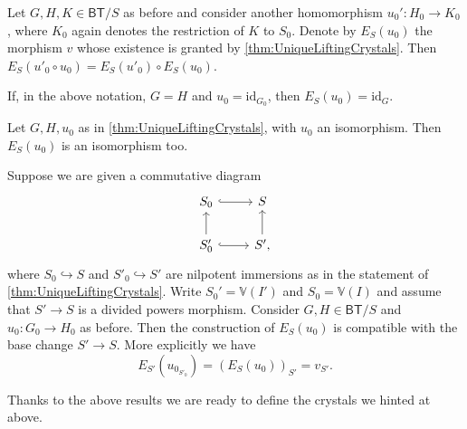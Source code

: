 \begin{cor}\label{thm:M4.2.4.1}
	Let $G, H, K \in \mathsf{BT}/S$ as before and consider another
	homomorphism $u_0'\colon H_0 \to K_0$, where $K_0$ again denotes
	the restriction of $K$ to $S_0$.
	Denote by $E_S(u_0)$ the morphism $v$ whose existence is granted
	by \cref{thm:UniqueLiftingCrystals}.
	Then $E_S(u'_0 \circ u_0) = E_S(u'_0) \circ E_S(u_0)$.
\end{cor} 


\begin{cor}\label{thm:M4.2.4.2}
	If, in the above notation, $G = H$ and $u_0 = \mathrm{id}_{ G_0 }$,
	then $E_S(u_0) = \mathrm{id}_{ G }$.
\end{cor} 


\begin{cor}\label{thm:M4.2.4.3}
	Let $G,H, u_0$ as in \cref{thm:UniqueLiftingCrystals},
	with $u_0$ an isomorphism.
	Then $E_S(u_0)$ is an isomorphism too.
\end{cor} 


\begin{cor}\label{thm:M4.2.4.4}
	Suppose we are given a commutative diagram
	\begin{equation*}
	\begin{tikzcd}
		S_0 \arrow[r, "", hookrightarrow] &
		S \\
		S_0' \arrow[u, "", rightarrow] 
		\arrow[r, "", hookrightarrow] &
		S' \arrow[u, "", rightarrow] 
	,\end{tikzcd}
	\end{equation*}
	where $S_0 \hookrightarrow S$ and $S'_0 \hookrightarrow S'$ are
	nilpotent immersions as in the statement of \cref{thm:UniqueLiftingCrystals}.
	Write $S_0' = \mathbb{V}(I')$ and $S_0 = \mathbb{V}(I)$
	and assume that $S' \to S$ is a divided powers morphism.
	Consider $G,H \in \mathsf{BT}/S$ and $u_0\colon G_0 \to H_0$ as before.
	Then the construction of $E_S(u_0)$ is compatible with the base
	change $S' \to S$.
	More explicitly we have
	\begin{equation*}
		E_{S'}(u_{0_{S'_0}}) =
		\left( E_S(u_0) \right)_{S'} = v_{S'}
	.\end{equation*}
\end{cor} 


\noindent
Thanks to the above results we are ready to define the crystals we hinted at above.


